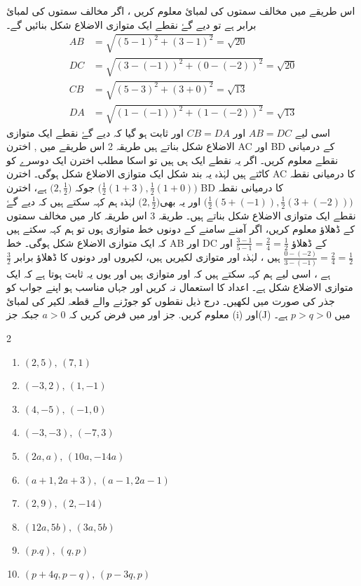  اس طریقے میں مخالف سمتوں کی لمبائ معلوم کریں ، اگر مخالف سمتوں کی لمبائ برابر ہے تو دیے گۓ نقطے ایک متوازی الاضلاع شکل بنائیں گے۔
\begin{align*}
AB &= \sqrt{(5-1)^2 + (3-1)^2} = \sqrt{20} \\ DC &= \sqrt{(3-(-1))^2 + (0-(-2))^2} = \sqrt{20} \\ CB &= \sqrt{(5-3)^{2} + (3+0)^{2}} = \sqrt{13} \\ DA &= \sqrt{(1-(-1))^2 + (1-(-2))^2} = \sqrt{13} 
\end{align*}
اسی لیے \( AB = DC \)  اور   \( CB = DA \) اور ثابت ہو گیا کہ دیے گۓ نقطے ایک متوازی الاضلاع شکل بناتے ہیں
طریقہ 2 
اس طریقے میں , اخترن    AC  اور     BD   کے درمیانی نقطے معلوم کریں۔ اگر یہ نقطے ایک ہی ہیں تو اسکا مطلب اخترن ایک دوسرے کو کاٹتے ہیں  لہٰذہ یہ بند شکل ایک متوازی الاضلاع شکل ہوگی۔
اخترن  AC کا درمیانی نقطہ \( \big( \frac{1}{2}(1+3),\frac{1}{2}(1+0)\big)  \) جوکہ \(  \big( 2, \frac{1}{2}\big)\) ہے، اخترن  BD کا  درمیانی نقطہ \(    \big( \frac{1}{2}(5+(-1)) , \frac{1}{2}(3+(-2))     \big) \) اور یہ بھی\(  \big( 2, \frac{1}{2}\big)\) لہٰذہ ہم کہہ سکتے ہیں کہ دیے گۓ نقطے ایک متوازی الاضلاع شکل بناتے ہیں۔
طریقہ 3 
اس طریقہ کار میں مخالف سمتوں کے ڈھلاؤ معلوم کریں، اگر آمنے سامنے کے دونوں خط متوازی ہوں تو ہم کہہ سکتے ہیں کہ    ایک متوازی الاضلاع شکل ہوگی۔ خط AB  اور  DC  کے ڈھلاؤ \(  \frac{3-1}{5-1}=\frac{2}{4}=\frac{1}{2}        \) اور \( \frac{0-(-2)}{3-(-1)}=\frac{2}{4}=\frac{1}{2}  \)  ہیں ، لہٰذہ   اور  متوازی لکیریں ہیں، لکیروں      اور      دونوں کا ڈھلاؤ  برابر  \(  \frac{3}{2}\)  ہے ، اسی لیے ہم کہہ سکتے ہیں کہ     اور     متوازی ہیں اور یوں یہ ثابت ہوتا ہے کہ    ایک متوازی الاضلاع شکل ہے۔
اعداد کا استعمال نہ کریں اور جہاں مناسب ہو اپنے جواب کو جذر کی صورت میں لکھیں۔
درج ذیل نقطوں کو جوڑنے والے قطعہ لکیر کی لمبائ معلوم کریں. جز   اور  میں فرض کریں کہ    \(a> 0\)  جبکہ جز   (i)    اور(J) میں      \( p>q > 0   \)   ہے۔
\begin{multicols}{2}
\begin{enumerate}[.a]
\item \( (2,5), \,  (7,1)  \) 
\item \( (-3,2), \,  (1,-1) \)
\item \( (4,-5), \,  (-1,0) \)
\item \( (-3,-3), \,  (-7,3) \)
\item \( (2a,a), \,  (10a, -14a) \)
\item \( (a+1, 2a+3), \,  (a-1, 2a-1) \)
\item \( (2,9), \,  (2,-14) \)
\item \( (12a,5b), \,  (3a,5b) \)
\item \( (p.q), \,  (q,p) \) 
\item \( (p+4q, p-q), \,  (p-3q,p) \)
\end{enumerate}
\end{multicols}
